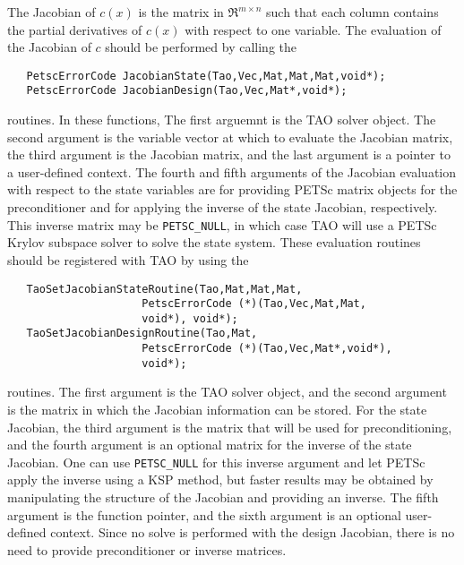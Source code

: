The Jacobian of $c(x)$ is the matrix in $\Re^{m \times n}$ such that each 
column contains the partial derivatives of $c(x)$ with respect to one 
variable.  The evaluation of the Jacobian of $c$ should be performed 
by calling the 
\begin{verbatim}
   PetscErrorCode JacobianState(Tao,Vec,Mat,Mat,Mat,void*);
   PetscErrorCode JacobianDesign(Tao,Vec,Mat*,void*);
\end{verbatim}
routines. 
In these functions, The first arguemnt is the TAO solver object.  The second 
argument is the variable vector at which to 
evaluate the Jacobian matrix, the third argument is the Jacobian matrix,
and the last argument is a pointer to a user-defined context. The fourth
and
fifth arguments of the Jacobian evaluation with respect to the state
variables
are for providing PETSc matrix objects for the preconditioner and for
applying
the inverse of the state Jacobian, respectively.  This inverse matrix may be 
{\tt PETSC\_NULL}, in which case TAO will use a PETSc Krylov subspace 
solver to solve the state system.  These evaluation routines should be 
registered 
with TAO by using the 
\begin{verbatim}
   TaoSetJacobianStateRoutine(Tao,Mat,Mat,Mat,
                     PetscErrorCode (*)(Tao,Vec,Mat,Mat,
                     void*), void*);
   TaoSetJacobianDesignRoutine(Tao,Mat,
                     PetscErrorCode (*)(Tao,Vec,Mat*,void*), 
                     void*);
\end{verbatim}
routines. 
The first argument is the TAO solver object, and the second argument is the
matrix 
in which the Jacobian information can be stored.  For the state Jacobian,
the 
third argument is the matrix that will be used for preconditioning, and the 
fourth argument is an optional matrix for the inverse of the state
Jacobian.
One can use {\tt PETSC\_NULL} for this inverse argument and let PETSc
apply 
the inverse using a KSP method, but faster results may be obtained by
manipulating the structure of the Jacobian and providing an inverse.
The fifth argument is the function pointer, and the sixth argument is
an optional user-defined context.  Since no solve is performed with the
design Jacobian, there is no need to provide preconditioner or inverse
matrices.


